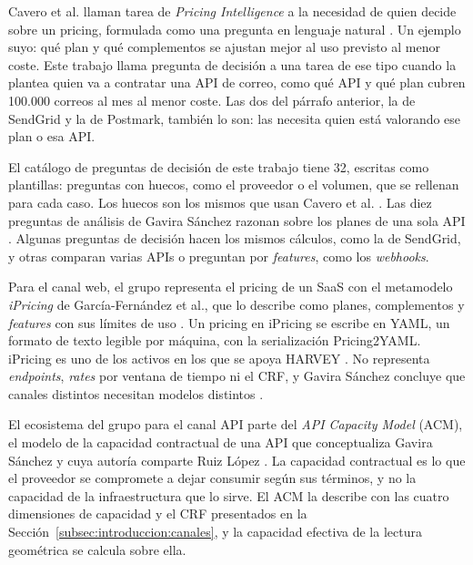 Cavero et al. llaman tarea de \textit{Pricing Intelligence} a la necesidad de
quien decide sobre un pricing, formulada como una pregunta en lenguaje natural
\citep{cavero2026pricingintelligence}. Un ejemplo suyo: qué plan y qué
complementos se ajustan mejor al uso previsto al menor coste. Este trabajo
llama pregunta de decisión a una tarea de ese tipo cuando la plantea quien va a
contratar una API de correo, como qué API y qué plan cubren 100.000 correos al
mes al menor coste. Las dos del párrafo anterior, la de SendGrid y la de
Postmark, también lo son: las necesita quien está valorando ese plan o esa API.

El catálogo de preguntas de decisión de este trabajo tiene 32, escritas como
plantillas: preguntas con huecos, como el proveedor o el volumen, que se
rellenan para cada caso. Los huecos son los mismos que usan Cavero et al.
\citep{cavero2026pricingintelligence}. Las diez preguntas de análisis de
Gavira Sánchez razonan sobre los planes de una sola API \citep{gavira2026tfm}.
Algunas preguntas de decisión hacen los mismos cálculos, como la de SendGrid,
y otras comparan varias APIs o preguntan por \textit{features}, como los
\textit{webhooks}.

Para el canal web, el grupo representa el pricing de un SaaS con el metamodelo
\textit{iPricing} de García-Fernández et al., que lo describe como planes,
complementos y \textit{features} con sus límites de uso
\citep{garciafernandez2025ipricing}. Un pricing en iPricing se escribe en
YAML, un formato de texto legible por máquina, con la serialización
Pricing2YAML. iPricing es uno de los activos en los que se apoya HARVEY
\citep{gavira2026tfm}. No representa \textit{endpoints}, \textit{rates} por
ventana de tiempo ni el CRF, y Gavira Sánchez concluye que canales distintos
necesitan modelos distintos \citep{gavira2026tfm}.

El ecosistema del grupo para el canal API parte del \textit{API Capacity
Model} (ACM), el modelo de la capacidad contractual de una API que
conceptualiza Gavira Sánchez \citep{gavira2026tfm} y cuya autoría comparte Ruiz
López \citep{ruizlopez2026tfm}. La capacidad contractual es lo que el proveedor
se compromete a dejar consumir según sus términos, y no la capacidad de la
infraestructura que lo sirve. El ACM la describe con las cuatro dimensiones de
capacidad y el CRF presentados en la Sección~\ref{subsec:introduccion:canales},
y la capacidad efectiva de la lectura geométrica se calcula sobre ella.

